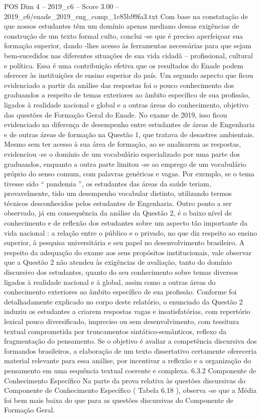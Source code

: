 \begin{textsample}{POS Dim 4 – 2019\_c6 – Score 3.00 – 2019\_c6/enade\_2019\_eng\_comp\_1c85b99fa3.txt}
Com base na constatação de que nossos estudantes têm um domínio apenas mediano dessas exigências de construção de um texto formal culto, conclui -se que é preciso aperfeiçoar sua formação superior, dando -lhes acesso às ferramentas necessárias para que sejam bem-sucedidos nas diferentes situações de sua vida cidadã – profissional, cultural e política.
Essa é uma contribuição efetiva que os resultados do Enade podem oferecer às instituições de ensino superior do país.
Um segundo aspecto que ficou evidenciado a partir da análise das respostas foi o pouco conhecimento dos graduandos a respeito de temas exteriores ao âmbito específico de sua profissão, ligados à realidade nacional e global e a outras áreas do conhecimento, objetivo das questões de Formação Geral do Enade.
No exame de 2019, isso ficou evidenciado na diferença de desempenho entre estudantes de áreas de Engenharia e de outras áreas de formação na Questão 1, que tratava de desastres ambientais.
Mesmo sem ter acesso à sua área de formação, ao se analisarem as respostas, evidenciou -se o domínio de um vocabulário especializado por uma parte dos graduandos, enquanto a outra parte limitou -se ao emprego de um vocabulário próprio do senso comum, com palavras genéricas e vagas.
Por exemplo, se o tema tivesse sido “ pandemia ”, os estudantes das áreas da saúde teriam, provavelmente, tido um desempenho vocabular distinto, utilizando termos técnicos desconhecidos pelos estudantes de Engenharia.
Outro ponto a ser observado, já em consequência da análise da Questão 2, é o baixo nível de conhecimento e de reflexão dos estudantes sobre um aspecto tão importante da vida nacional : a relação entre o público e o privado, no que diz respeito ao ensino superior, à pesquisa universitária e seu papel no desenvolvimento brasileiro.
A respeito da adequação do exame aos seus propósitos institucionais, vale observar que a Questão 2 não atendeu às exigências de avaliação, tanto do domínio discursivo dos estudantes, quanto do seu conhecimento sobre temas diversos ligados à realidade nacional e à global, assim como a outras áreas do conhecimento exteriores ao âmbito específico de sua profissão.
Conforme foi detalhadamente explicado no corpo deste relatório, o enunciado da Questão 2 induziu os estudantes a criarem respostas vagas e insatisfatórias, com repertório lexical pouco diversificado, impreciso ou sem desenvolvimento, com tessitura textual comprometida por truncamentos sintático-semânticos, reflexo da fragmentação do pensamento.
Se o objetivo é avaliar a competência discursiva dos formandos brasileiros, a elaboração de um texto dissertativo certamente ofereceria material relevante para essa análise, por incentivar a reflexão e a organização do pensamento em uma sequência textual coerente e complexa. 6.3.2 Componente de Conhecimento Específico Na parte da prova relativa às questões discursivas do Componente de Conhecimento Específico ( Tabela 6.18 ), observa -se que a Média foi bem mais baixa do que para as questões discursivas do Componente de Formação Geral.

\end{textsample}
